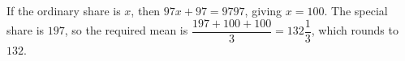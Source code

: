 If the ordinary share is $x$, then $97x+97=9797$, giving $x=100$. The special share is $197$, so the required mean is $\dfrac{197+100+100}{3}=132\dfrac{1}{3}$, which rounds to $\boxed{132}$.
